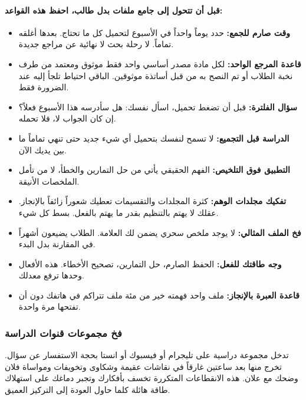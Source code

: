 \documentclass[12pt,a4paper]{book}
\begin{document}
\paragraph{قبل أن تتحول إلى جامع ملفات بدل طالب، احفظ هذه القواعد:}

\begin{itemize}
	\item \textbf{وقت صارم للجمع:} حدد يوماً واحداً في الأسبوع لتحميل كل ما تحتاج. بعدها أغلقه تماماً. لا رحلة بحث لا نهائية عن مراجع جديدة.
	
	\item \textbf{قاعدة المرجع الواحد:} لكل مادة مصدر أساسي واحد فقط موثوق ومعتمد من طرف نخبة الطلاب أو تم النصح به من قبل أساتذة موثوقين. الباقي احتياط تلجأ إليه عند الضرورة فقط.
	
	\item \textbf{سؤال الفلترة:} قبل أن تضغط تحميل، اسأل نفسك: هل سأدرسه هذا الأسبوع فعلاً؟ إن كان الجواب لا، فلا تحمله.
	
	\item \textbf{الدراسة قبل التجميع:} لا تسمح لنفسك بتحميل أي شيء جديد حتى تنهي تماماً ما بين يديك الآن.
	
	\item \textbf{التطبيق فوق التلخيص:} الفهم الحقيقي يأتي من حل التمارين والخطأ، لا من تأمل الملخصات الأنيقة.
	
	\item \textbf{تفكيك مجلدات الوهم:} كثرة المجلدات والتقسيمات تعطيك شعوراً زائفاً بالإنجاز. عقلك لا يهتم بالتنظيم بقدر ما يهتم بالفعل. بسط كل شيء.
	
	\item \textbf{فخ الملف المثالي:} لا يوجد ملخص سحري يضمن لك العلامة. الطلاب يضيعون أشهراً في المقارنة بدل البدء.
	
	\item \textbf{وجه طاقتك للفعل:} الحفظ الصارم، حل التمارين، تصحيح الأخطاء. هذه الأفعال وحدها ترفع معدلك.
	
	\item \textbf{قاعدة العبرة بالإنجاز:} ملف واحد فهمته خير من مئة ملف تتراكم في هاتفك دون أن تفتحها مرة واحدة.
\end{itemize}

\subsubsection{فخ مجموعات قنوات الدراسة}

تدخل مجموعة دراسية على تليجرام أو فيسبوك أو انستا بحجة الاستفسار عن سؤال. تخرج منها بعد ساعتين غارقاً في نقاشات عقيمة وشكاوى وتخويفات ومواساة فلان وضحك مع علان. هذه الانقطاعات المتكررة تخسف بأفكارك وتجبر دماغك على استهلاك طاقة هائلة كلما حاول العودة إلى التركيز العميق.
\end{document}
